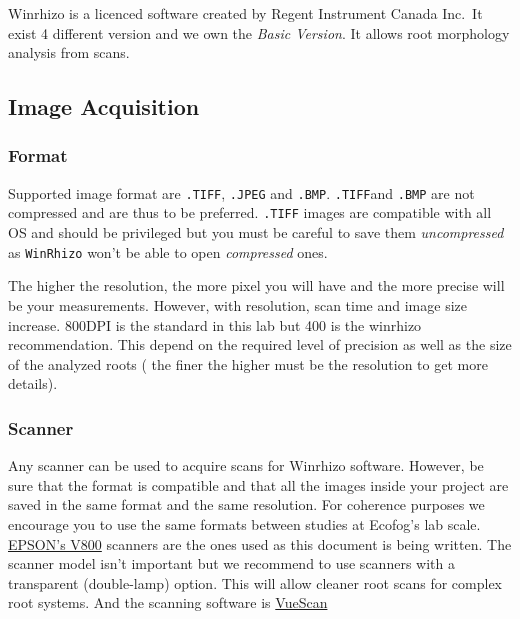 \documentclass[
  12pt,
  american,
  a4paper,
  extrafontsizes,onecolumn,openright
  ]{memoir}
\begin{document}
Winrhizo is a licenced software created by Regent Instrument Canada Inc.~It exist 4 different version and we own the \emph{Basic Version}. It allows root morphology analysis from scans.

\hypertarget{image-acquisition}{%
\subsection{Image Acquisition}\label{image-acquisition}}

\hypertarget{format}{%
\subsubsection{Format}\label{format}}

Supported image format are \texttt{.TIFF}, \texttt{.JPEG} and \texttt{.BMP}. \texttt{.TIFF}and \texttt{.BMP} are not compressed and are thus to be preferred. \texttt{.TIFF} images are compatible with all OS and should be privileged but you must be careful to save them \emph{uncompressed} as \texttt{WinRhizo} won't be able to open \emph{compressed} ones.

The higher the resolution, the more pixel you will have and the more precise will be your measurements. However, with resolution, scan time and image size increase. 800DPI is the standard in this lab but 400 is the winrhizo recommendation. This depend on the required level of precision as well as the size of the analyzed roots ( the finer the higher must be the resolution to get more details).

\hypertarget{scanner}{%
\subsubsection{Scanner}\label{scanner}}

Any scanner can be used to acquire scans for Winrhizo software. However, be sure that the format is compatible and that all the images inside your project are saved in the same format and the same resolution. For coherence purposes we encourage you to use the same formats between studies at Ecofog's lab scale.
\href{document/machine/EPSON_V800/usersguide.pdf}{EPSON's V800} scanners are the ones used as this document is being written. The scanner model isn't important but we recommend to use scanners with a transparent (double-lamp) option. This will allow cleaner root scans for complex root systems.
And the scanning software is \href{https://www.hamrick.com/vuescan/epson.html}{VueScan}
\end{document}
